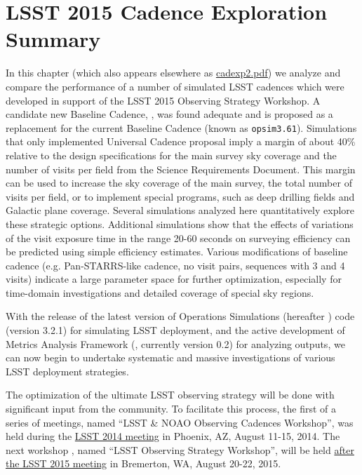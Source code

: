 
\chapter[LSST 2015 Cadence Exploration]{LSST 2015 Cadence Exploration Summary}
\def\chpname{cadence2015}\label{chp:\chpname}



In this chapter (which also appears elsewhere as
\href{http://www.astro.washington.edu/users/ivezic/lsst/cadexp2.pdf}{cadexp2.pdf})
we analyze and compare the performance of a number of simulated LSST
cadences which were developed in support of the LSST 2015 Observing
Strategy Workshop.  A candidate new Baseline Cadence, ,
was found adequate and is proposed as  a replacement for the current
Baseline Cadence (known as \texttt{opsim3.61}). Simulations that only
implemented Universal Cadence proposal imply a margin of about 40\%
relative to the design specifications for the main survey sky coverage
and the number of  visits per field from the Science Requirements
Document. This margin can be used to increase the sky coverage of the
main survey, the total number of visits per field, or to implement
special programs, such as deep drilling fields and Galactic plane
coverage. Several  simulations analyzed here quantitatively explore
these strategic options.  Additional simulations show that the effects
of variations of the visit exposure time in the  range 20-60 seconds
on surveying efficiency can be predicted using simple efficiency
estimates. Various modifications of baseline cadence (e.g.
Pan-STARRS-like cadence,  no visit pairs, sequences with 3 and 4
visits) indicate a large parameter space for further optimization,
especially for time-domain investigations and detailed coverage of
special sky regions.

With the release of the latest version of Operations Simulations
(hereafter \OpSim) code (version 3.2.1)  for simulating LSST
deployment, and the active development of Metrics Analysis Framework
(\MAF,  currently version 0.2) for analyzing \OpSim outputs, we can
now begin to undertake systematic and  massive investigations of
various LSST deployment strategies.

The optimization of the ultimate LSST observing strategy will be done
with significant input from  the community. To facilitate this
process, the first of a series of meetings, named ``LSST \& NOAO
Observing Cadences Workshop'', was held during the
\href{https://project.lsst.org/meetings/ocw}{LSST 2014 meeting} in
Phoenix, AZ, August 11-15, 2014. The next workshop , named ``LSST
Observing Strategy Workshop'',  will be held
\href{http://lsstsciencecollaborations.github.io/ObservingStrategy/}{after
the LSST 2015 meeting} in Bremerton, WA, August 20-22, 2015.

